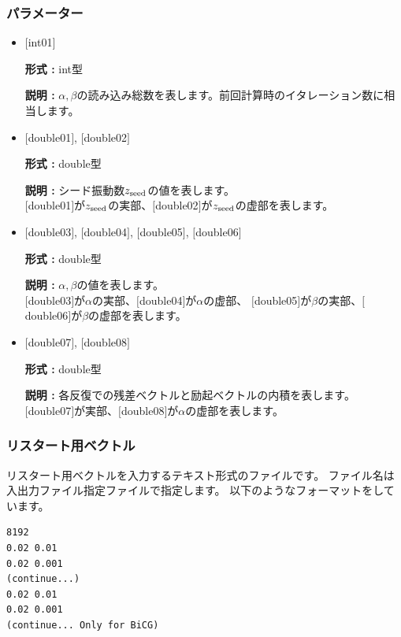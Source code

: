 \documentclass[12pt,titlepage]{jarticle}
\begin{document}
\subsubsection{パラメーター}

\begin{itemize}

\item  $[$int01$]$

  {\bf 形式 :} int型

  {\bf 説明 :} $\alpha, \beta$の読み込み総数を表します。前回計算時のイタレーション数に相当します。
 
\item  $[$double01$]$, $[$double02$]$

  {\bf 形式 :} double型 

  {\bf 説明 :} シード振動数$z_{\rm seed}$の値を表します。\\
  $[$double01$]$が$z_{\rm seed}$の実部、$[$double02$]$が$z_{\rm seed}$の虚部を表します。\\

\item  $[$double03$]$, $[$double04$]$, $[$double05$]$, $[$double06$]$

  {\bf 形式 :} double型 

  {\bf 説明 :} $\alpha, \beta$の値を表します。\\
  $[$double03$]$が$\alpha$の実部、$[$double04$]$が$\alpha$の虚部、
  $[$double05$]$が$\beta$の実部、$[$double06$]$が$\beta$の虚部を表します。\\

\item  $[$double07$]$, $[$double08$]$

  {\bf 形式 :} double型 

  {\bf 説明 :} 各反復での残差ベクトルと励起ベクトルの内積を表します。\\
  $[$double07$]$が実部、$[$double08$]$が$\alpha$の虚部を表します。\\

\end{itemize}


\newpage
\subsubsection{リスタート用ベクトル}\label{subsubsec:revec}
リスタート用ベクトルを入力するテキスト形式のファイルです。
ファイル名は入出力ファイル指定ファイルで指定します。
以下のようなフォーマットをしています。
\\
\begin{minipage}{10cm}
\begin{screen}
\begin{verbatim}
8192
0.02 0.01
0.02 0.001
(continue...)
0.02 0.01
0.02 0.001
(continue... Only for BiCG)
\end{verbatim}
\end{screen}
\end{minipage}
\end{document}
